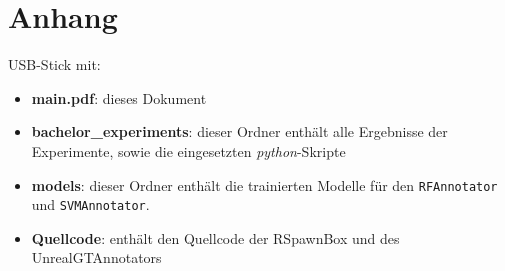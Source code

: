 \appendix
\chapter{Anhang}

USB-Stick mit:
\begin{itemize}
	\item \textbf{main.pdf}: dieses Dokument
	\item \textbf{bachelor\_experiments}: dieser Ordner enthält alle Ergebnisse der Experimente, sowie die eingesetzten \textit{python}-Skripte 
	\item \textbf{models}: dieser Ordner enthält die trainierten Modelle für den \texttt{RFAnnotator} und \texttt{SVMAnnotator}. 
	\item \textbf{Quellcode}: enthält den Quellcode der RSpawnBox und des UnrealGTAnnotators
\end{itemize}
